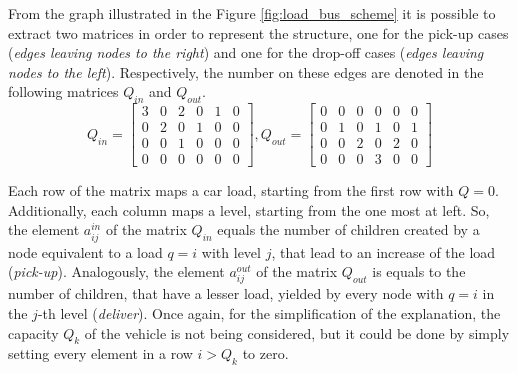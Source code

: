 \documentclass[tuberlin,cic,tc,openright,english,noabntcite,oneside]{iiufrgs}
\begin{document}
From the graph illustrated in the Figure \ref{fig:load_bus_scheme} it is possible to extract two matrices in order to represent the structure, one for the pick-up cases (\emph{edges leaving nodes to the right}) and one for the drop-off cases (\emph{edges leaving nodes to the left}). Respectively, the number on these edges are denoted in the following matrices $Q_{in}$ and $Q_{out}$.
$$
Q_{in} = 
\begin{bmatrix}
3 & 0 & 2 & 0 & 1 & 0\\
0 & 2 & 0 & 1 & 0 & 0\\
0 & 0 & 1 & 0 & 0 & 0\\
0 & 0 & 0 & 0 & 0 & 0
\end{bmatrix}
,
Q_{out} = 
\begin{bmatrix}
0 & 0 & 0 & 0 & 0 & 0\\
0 & 1 & 0 & 1 & 0 & 1\\
0 & 0 & 2 & 0 & 2 & 0\\
0 & 0 & 0 & 3 & 0 & 0
\end{bmatrix}
$$

Each row of the matrix maps a car load, starting from the first row with $Q=0$. Additionally, each column maps a level, starting from the one most at left. So, the element $a^{in}_{ij}$ of the matrix $Q_{in}$ equals the number of children created by a node equivalent to a load $q=i$ with level $j$, that lead to an increase of the load (\emph{pick-up}). Analogously, the element $a^{out}_{ij}$ of the matrix $Q_{out}$ is equals to the number of children, that have a lesser load, yielded by every node with $q=i$ in the $j$-th level (\emph{deliver}). Once again, for the simplification of the explanation, the capacity $Q_k$ of the vehicle is not being considered, but it could be done by simply setting every element in a row $i>Q_k$ to zero.
\end{document}
